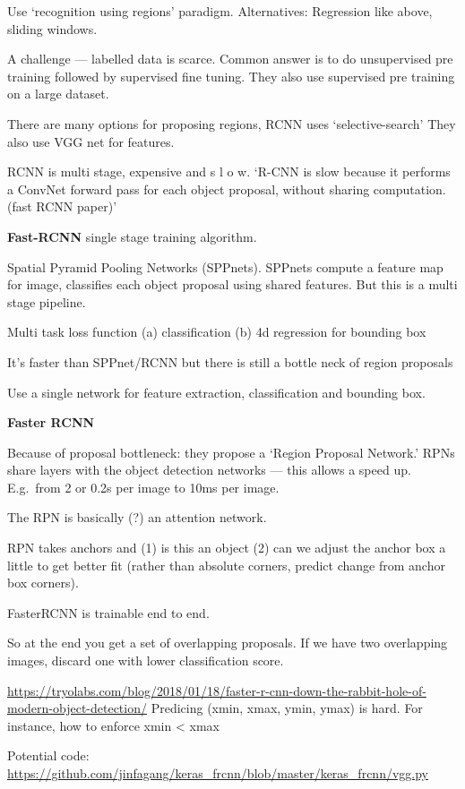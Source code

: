 \documentclass[12pt, a4paper, oneside, headinclude, footinclude]{article}
\begin{document}
Use `recognition using regions' paradigm.
Alternatives: Regression like above, sliding windows.

A challenge --- labelled data is scarce. Common answer is to do unsupervised
pre training followed by supervised fine tuning. They also use supervised pre
training on a large dataset.

There are many options for proposing regions, RCNN uses `selective-search'
They also use VGG net for features.

RCNN is multi stage, expensive and s l o w. `R-CNN is slow because it performs
a ConvNet forward pass for each object proposal, without sharing computation.
(fast RCNN paper)'

\textbf{Fast-RCNN} single stage training algorithm. 

Spatial Pyramid Pooling Networks (SPPnets). SPPnets compute a feature map
for image, classifies each object proposal using shared features. But this is
a multi stage pipeline.

Multi task loss function
    (a) classification
    (b) 4d regression for bounding box

It's faster than SPPnet/RCNN but there is still a bottle neck of region
proposals

Use a single network for feature extraction, classification and bounding box.


\textbf{Faster RCNN}~\cite{Ren2017}

Because of proposal bottleneck: they propose a `Region Proposal Network.' RPNs
share layers with the object detection networks --- this allows a speed up.
E.g.\ from 2 or 0.2s per image to 10ms per image.

The RPN is basically (?) an attention network.

RPN takes anchors and (1) is this an object (2) can we adjust the anchor box
a little to get better fit (rather than absolute corners, predict change from
anchor box corners).

FasterRCNN is trainable end to end.

So at the end you get a set of overlapping proposals. If we have two
overlapping images, discard one with lower classification score.

\url{https://tryolabs.com/blog/2018/01/18/faster-r-cnn-down-the-rabbit-hole-of-modern-object-detection/}
Predicing (xmin, xmax, ymin, ymax) is hard. For instance, how to enforce
xmin < xmax

Potential code:
\url{https://github.com/jinfagang/keras\_frcnn/blob/master/keras\_frcnn/vgg.py}
\end{document}
